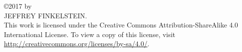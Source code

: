 \thispagestyle{empty}
\setlength{\parindent}{0pt}
\null
\vfill
\copyright 2017 by\\
\uppercase{Jeffrey Finkelstein}.\\
This work is licensed under the Creative Commons Attribution-ShareAlike 4.0 International License. To view a copy of this license, visit \url{http://creativecommons.org/licenses/by-sa/4.0/}.
